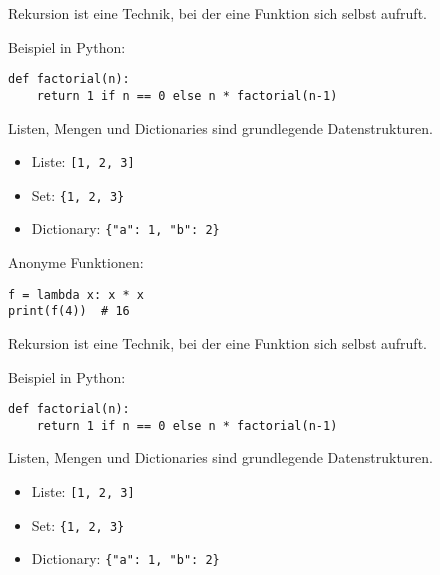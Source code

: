 \documentclass[
]{article}
\providecommand{\tightlist}{%
  \setlength{\itemsep}{0pt}\setlength{\parskip}{0pt}}\usepackage{longtable,booktabs,array}
\newenvironment{cheatboxparacol}{\par\vspace{2pt}\noindent\begin{tcolorbox}[enhanced, sharp corners, colback=gray!5]}{\end{tcolorbox}\vspace{2pt}}
\begin{document}
\begin{cheatboxparacol}

Rekursion ist eine Technik, bei der eine Funktion sich selbst aufruft.

Beispiel in Python:

\begin{verbatim}
def factorial(n):
    return 1 if n == 0 else n * factorial(n-1)
\end{verbatim}

\end{cheatboxparacol}

\begin{cheatboxparacol}

Listen, Mengen und Dictionaries sind grundlegende Datenstrukturen.

\begin{itemize}
\tightlist
\item
  Liste: \texttt{{[}1,\ 2,\ 3{]}}
\item
  Set: \texttt{\{1,\ 2,\ 3\}}
\item
  Dictionary: \texttt{\{"a":\ 1,\ "b":\ 2\}}
\end{itemize}

\end{cheatboxparacol}

\begin{cheatboxparacol}

Anonyme Funktionen:

\begin{verbatim}
f = lambda x: x * x
print(f(4))  # 16
\end{verbatim}

\end{cheatboxparacol}

\begin{cheatboxparacol}

Rekursion ist eine Technik, bei der eine Funktion sich selbst aufruft.

Beispiel in Python:

\begin{verbatim}
def factorial(n):
    return 1 if n == 0 else n * factorial(n-1)
\end{verbatim}

\end{cheatboxparacol}

\begin{cheatboxparacol}

Listen, Mengen und Dictionaries sind grundlegende Datenstrukturen.

\begin{itemize}
\tightlist
\item
  Liste: \texttt{{[}1,\ 2,\ 3{]}}
\item
  Set: \texttt{\{1,\ 2,\ 3\}}
\item
  Dictionary: \texttt{\{"a":\ 1,\ "b":\ 2\}}
\end{itemize}

\end{cheatboxparacol}
\end{document}

